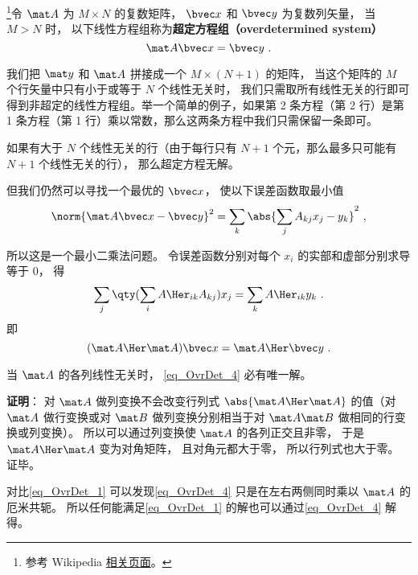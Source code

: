 

\footnote{参考 Wikipedia \href{https://en.wikipedia.org/wiki/Overdetermined_system}{相关页面}。}令 $\mat A$ 为 $M\times N$ 的复数矩阵， $\bvec x$ 和 $\bvec y$ 为复数列矢量， 当 $M > N$ 时， 以下线性方程组称为\textbf{超定方程组（overdetermined system）}
\begin{equation}\label{eq_OvrDet_1}
\mat A \bvec x = \bvec y~.
\end{equation}

我们把 $\mat y$ 和 $\mat A$ 拼接成一个 $M\times(N+1)$ 的矩阵， 当这个矩阵的 $M$ 个行矢量中只有小于或等于 $N$ 个线性无关时， 我们只需取所有线性无关的行即可得到非超定的线性方程组。举一个简单的例子，如果第 2 条方程（第 2 行）是第 1 条方程（第 1 行）乘以常数，那么这两条方程中我们只需保留一条即可。

如果有大于 $N$ 个线性无关的行（由于每行只有 $N+1$ 个元，那么最多只可能有 $N+1$ 个线性无关的行）， 那么超定方程无解。

但我们仍然可以寻找一个最优的 $\bvec x$， 使以下误差函数取最小值
\begin{equation}
\norm{\mat A\bvec x - \bvec y}^2 =  \sum_k  \abs{\sum_j A_{kj} x_j - y_k}^2~,
\end{equation}

所以这是一个最小二乘法问题。 令误差函数分别对每个 $x_i$ 的实部和虚部分别求导等于 0， 得
\begin{equation}
\sum_j \qty(\sum_i A\Her_{ik} A_{kj}) x_j = \sum_k A\Her_{ik} y_k~.
\end{equation}
即
\begin{equation}\label{eq_OvrDet_4}
(\mat A\Her \mat A) \bvec x = \mat A\Her \bvec y~.
\end{equation}

\begin{theorem}{}\label{the_OvrDet_1}
当 $\mat A$ 的各列线性无关时， \autoref{eq_OvrDet_4} 必有唯一解。
\end{theorem}

\textbf{证明}： 对 $\mat A$ 做列变换不会改变行列式 $\abs{\mat A\Her \mat A}$ 的值（对 $\mat A$ 做行变换或对 $\mat B$ 做列变换分别相当于对 $\mat A\mat B$ 做相同的行变换或列变换）。 所以可以通过列变换使 $\mat A$ 的各列正交且非零， 于是 $\mat A\Her \mat A$ 变为对角矩阵， 且对角元都大于零， 所以行列式也大于零。 证毕。

对比\autoref{eq_OvrDet_1} 可以发现\autoref{eq_OvrDet_4} 只是在左右两侧同时乘以 $\mat A$ 的厄米共轭。 所以任何能满足\autoref{eq_OvrDet_1} 的解也可以通过\autoref{eq_OvrDet_4} 解得。
